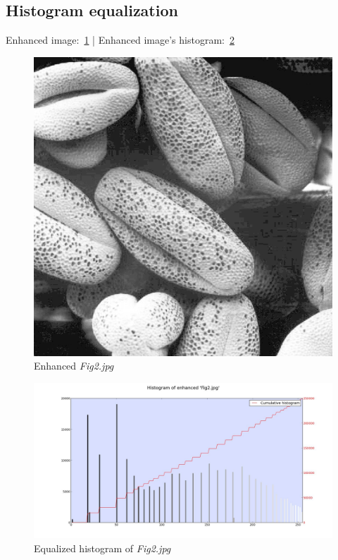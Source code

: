     \subsection{Histogram equalization}

    Enhanced image:~\ref{diagram:enhanced_fig2} |
    Enhanced image's histogram:~\ref{diagram:equal_hist_fig2}

    \begin{figure}[!htb]\centering
        \includegraphics[width=0.7\linewidth]{./images/1/Enhanced_Fig2.jpg}
        \caption{Enhanced \textit{Fig2.jpg}}\label{diagram:enhanced_fig2}
    \end{figure}

    \begin{figure}[!htb]\centering
        \includegraphics[width=\linewidth]{./images/1/Equalized_Histogram_Fig2.jpg}
        \caption{Equalized histogram of \textit{Fig2.jpg}}\label{diagram:equal_hist_fig2}
    \end{figure}

